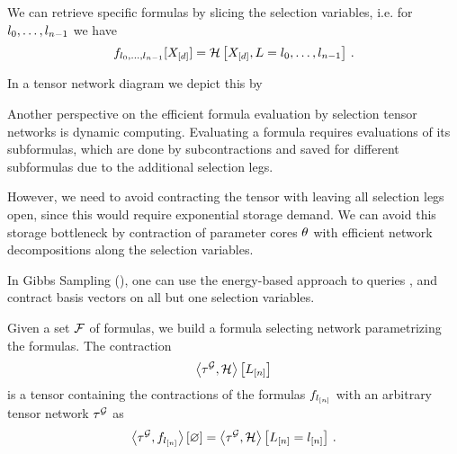We can retrieve specific formulas by slicing the selection variables, i.e. for $l_{0},\ldots,l_{n-1}$ we have
	\[ f_{l_{0},\ldots,l_{n-1}}[X_{[d]}] = \mathcal{H}\left[X_{[d]},L=l_{0},\ldots,l_{n-1}\right] \, .  \]

In a tensor network diagram we depict this by
\begin{center}
	
\end{center}

Another perspective on the efficient formula evaluation by selection tensor networks is dynamic computing.
Evaluating a formula requires evaluations of its subformulas, which are done by subcontractions and saved for different subformulas due to the additional selection legs.

However, we need to avoid contracting the tensor with leaving all selection legs open, since this would require exponential storage demand.
We can avoid this storage bottleneck by contraction of parameter cores $\theta$ with efficient network decompositions along the selection variables. %

In Gibbs Sampling (), one can use the energy-based approach to queries , and contract basis vectors on all but one selection variables.





Given a set $\mathcal{F}$ of formulas, we build a formula selecting network parametrizing the formulas.
The contraction 
\begin{align*}
	\left\langle \tau^{\mathcal{G}},\mathcal{H}\right\rangle \left[ L_{[n]} \right] 
\end{align*}
is a tensor containing the contractions of the formulas $f_{l_{[n]}}$ with an arbitrary tensor network $\tau^{\mathcal{G}}$ as
\begin{align*}
	\left\langle \tau^{\mathcal{G}},f_{l_{[n]}}\right\rangle \left[ \varnothing \right] = \left\langle \tau^{\mathcal{G}},\mathcal{H}\right\rangle \left[ L_{[n]}=l_{[n]} \right] \, .
\end{align*}


